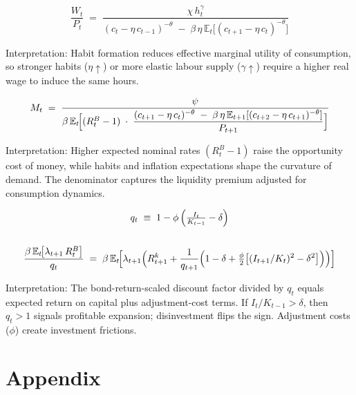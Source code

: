 \documentclass[11pt,preprint]{elsarticle}
\numberwithin{equation}{section}
\numberwithin{figure}{section}
\numberwithin{table}{section}
\begin{document}
\begin{equation}\label{labourSupply}
  \frac{W_t}{P_t}
  \;=\;
  \frac{\chi\,h_t^{\gamma}}
       {(c_t - \eta\,c_{t-1})^{-\theta}
        \;-\;
        \beta\,\eta\,\mathbb{E}_t\!\bigl[(c_{t+1} - \eta\,c_t)^{-\theta}\bigr]}
\end{equation}

Interpretation: Habit formation reduces effective marginal utility of
consumption, so stronger habits (\(\eta\uparrow\)) or more elastic
labour supply (\(\gamma\uparrow\)) require a higher real wage to induce
the same hours.

\begin{equation}\label{money_demand}
  M_t
  \;=\;
  \frac{\psi}
       {\beta\,\mathbb{E}_t\!\Bigl[
         (R_t^B - 1)
         \;\cdot\;
         \dfrac{(c_{t+1} - \eta\,c_t)^{-\theta}
               \;-\;
               \beta\,\eta\,\mathbb{E}_{t+1}[(c_{t+2} - \eta\,c_{t+1})^{-\theta}]}
              {P_{t+1}}
       \Bigr]}
\end{equation}

Interpretation: Higher expected nominal rates \((R_t^B - 1)\) raise the
opportunity cost of money, while habits and inflation expectations shape
the curvature of demand. The denominator captures the liquidity premium
adjusted for consumption dynamics.

\begin{equation}\label{capital_euler}
  \begin{gathered}
  q_t \;\equiv\; 1 - \phi\,\Bigl(\tfrac{I_t}{K_{t-1}} - \delta\Bigr) \\
  \\
  \frac{\beta\,\mathbb{E}_t\!\bigl[\lambda_{t+1}\,R_t^B\bigr]}{q_t}
  \;=\;
  \beta\,\mathbb{E}_t\!\Bigl[
    \lambda_{t+1}\Bigl(
      R_{t+1}^k
      + \frac{1}{q_{t+1}}
        \Bigl(
          1 - \delta
          + \tfrac{\phi}{2}\bigl[(I_{t+1}/K_t)^2 - \delta^2\bigr]
        \Bigr)
    \Bigr)
  \Bigr]
  \end{gathered}
\end{equation}

Interpretation: The bond-return-scaled discount factor divided by
\(q_t\) equals expected return on capital plus adjustment-cost terms. If
\(I_t/K_{t-1}>\delta\), then \(q_t>1\) signals profitable expansion;
disinvestment flips the sign. Adjustment costs (\(\phi\)) create
investment frictions.

\section{Appendix}\label{appendix}
\end{document}
